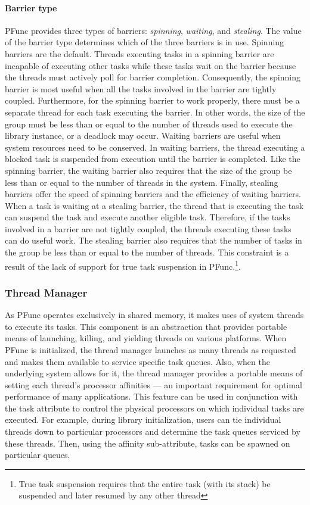 \paragraph{Barrier type} PFunc provides three types of barriers:
\emph{spinning}, \emph{waiting}, and \emph{stealing}. 
%
The value of the barrier type determines which of the three barriers is in use.
%
Spinning barriers are the default.
%
Threads executing tasks in a spinning barrier are incapable of executing other
tasks while these tasks wait on the barrier because the threads must actively
poll for barrier completion.
%
Consequently, the spinning barrier is most useful when all the tasks involved
in the barrier are tightly coupled.
%
Furthermore, for the spinning barrier to work properly, there must be a 
separate thread for each task executing the barrier.
% 
In other words, the size of the group must be less than or equal to the number
of threads used to execute the library instance, or a deadlock may occur.
%
Waiting barriers are useful when system resources need to be conserved. 
%
In waiting barriers, the thread executing a blocked task is suspended from
execution until the barrier is completed.
%
Like the spinning barrier, the waiting barrier also requires that the size of
the group be less than or equal to the number of threads in the system.
%
Finally, stealing barriers offer the speed of spinning barriers and the
efficiency of waiting barriers.
%
When a task is waiting at a stealing barrier, the thread that is executing the
task can suspend the task and execute another eligible task.
%
Therefore, if the tasks involved in a barrier are not tightly coupled, the 
threads executing these tasks can do useful work.
%
The stealing barrier also requires that the number of tasks in the group be
less than or equal to the number of threads.
%
This constraint is a result of the lack of support for true task suspension in
PFunc.\footnote{True task suspension requires that the entire task (with its
stack) be suspended and later resumed by any other thread}. 
%

\subsubsection{Thread Manager}
\label{subsubsec:thread_manager}
%
As PFunc operates exclusively in shared memory, it makes uses of system threads
to execute its tasks.
%
This component is an abstraction that provides portable means of launching,
killing, and yielding threads on various platforms.
%
When PFunc is initialized, the thread manager launches as many threads as
requested and makes them available to service specific task queues.
%
Also, when the underlying system allows for it, the thread manager provides a
portable means of setting each thread's processor affinities --- an important
requirement for optimal performance of many applications.
%
This feature can be used in conjunction with the task attribute to control the
physical processors on which individual tasks are executed.
%
For example, during library initialization, users can tie individual threads 
down to particular processors and determine the task queues serviced by these
threads.
%
Then, using the affinity sub-attribute, tasks can be spawned on particular queues.

